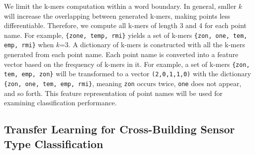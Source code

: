 We limit the k-mers computation within a word boundary.
In general, smller $k$ will increase the overlapping between generated k-mers, making points less differentiable.
Therefore, we compute all k-mers of length 3 and 4 for each point name.
For example, \texttt{\{zone, temp, rmi\}} yields a set of k-mers \texttt{\{zon, one, tem, emp, rmi\}} when $k$=3.
A dictionary of k-mers is constructed with all the k-mers generated from each point name.
Each point name is converted into a feature vector based on the frequency of k-mers in it.
For example, a set of k-mers \texttt{\{zon, tem, emp, zon\}} will be transformed to a vector
\texttt{(2,0,1,1,0)} with the dictionary \texttt{\{zon, one, tem, emp, rmi\}}, meaning \texttt{zon} occurs twice, \texttt{one} does
not appear, and so forth.
This feature representation of point names will be used for examining classification performance.

\subsection{Transfer Learning for Cross-Building Sensor Type Classification}

